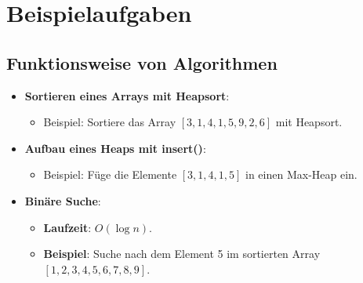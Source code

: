 \documentclass[a4paper,12pt]{article}
\begin{document}
\vspace{1em}

\section{Beispielaufgaben}
\subsection{Funktionsweise von Algorithmen}
\begin{itemize}
    \item \textbf{Sortieren eines Arrays mit Heapsort}:
    \begin{itemize}
        \item Beispiel: Sortiere das Array \([3, 1, 4, 1, 5, 9, 2, 6]\) mit Heapsort.
    \end{itemize}
    \item \textbf{Aufbau eines Heaps mit insert()}:
    \begin{itemize}
        \item Beispiel: Füge die Elemente \([3, 1, 4, 1, 5]\) in einen Max-Heap ein.
    \end{itemize}
    \item \textbf{Binäre Suche}:
    \begin{itemize}
        \item \textbf{Laufzeit}: \( O(\log n) \).
        \item \textbf{Beispiel}: Suche nach dem Element 5 im sortierten Array \([1, 2, 3, 4, 5, 6, 7, 8, 9]\).
    \end{itemize}
\end{itemize}

\vspace{1em}
\end{document}

